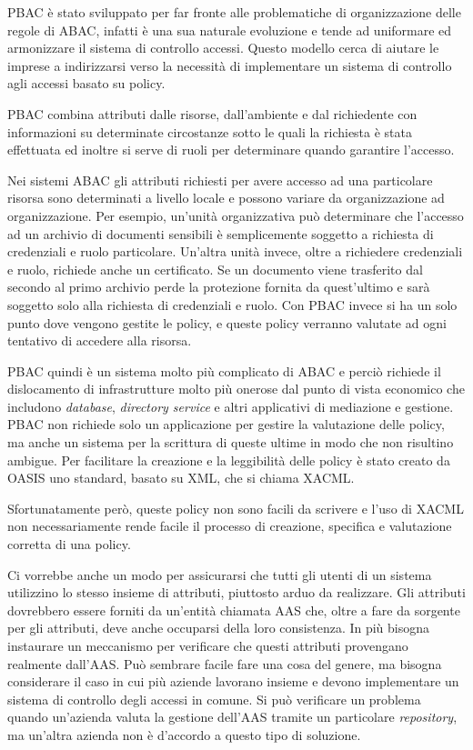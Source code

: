 \ac{PBAC} è stato sviluppato per far fronte alle problematiche di organizzazione delle regole di \ac{ABAC}, infatti è una sua naturale evoluzione e tende ad uniformare ed armonizzare il sistema di controllo accessi.
Questo modello cerca di aiutare le imprese a indirizzarsi verso la necessità di implementare un sistema di controllo agli accessi basato su policy.\par
\ac{PBAC} combina attributi dalle risorse, dall'ambiente e dal richiedente con informazioni su determinate circostanze sotto le quali la richiesta è stata effettuata ed inoltre si serve di 
ruoli per determinare quando garantire l'accesso.\par
Nei sistemi \ac{ABAC} gli attributi richiesti per avere accesso ad una particolare risorsa sono determinati a livello locale e possono variare da organizzazione ad organizzazione.
Per esempio, un'unità organizzativa può determinare che l'accesso ad un archivio di documenti sensibili è semplicemente soggetto a richiesta di credenziali e ruolo particolare.
Un'altra unità invece, oltre a richiedere credenziali e ruolo, richiede anche un certificato. Se un documento viene trasferito dal secondo al primo archivio perde la protezione fornita da quest'ultimo e sarà soggetto solo alla richiesta di credenziali e ruolo.
Con \ac{PBAC} invece si ha un solo punto dove vengono gestite le policy, e queste policy verranno valutate ad ogni tentativo di accedere alla risorsa.\par
\ac{PBAC} quindi è un sistema molto più complicato di \ac{ABAC} e perciò richiede il dislocamento di infrastrutture molto più onerose dal punto di vista economico che includono \textit{database}, \textit{directory service} e altri applicativi di mediazione e gestione.
\ac{PBAC} non richiede solo un applicazione per gestire la valutazione delle policy, ma
anche un sistema per la scrittura di queste ultime in modo che
non risultino ambigue.
Per facilitare la creazione e la leggibilità delle policy è stato creato da OASIS \cite{XACML} uno standard, basato su \ac{XML}, che si chiama \ac{XACML}.\par

Sfortunatamente però, queste policy non sono facili da scrivere e l’uso
di \ac{XACML} non necessariamente rende facile il processo di creazione, specifica e valutazione corretta di una policy. \par
Ci vorrebbe anche un modo per assicurarsi che tutti gli utenti di un sistema utilizzino lo stesso insieme di attributi, piuttosto arduo da realizzare. Gli attributi dovrebbero essere forniti da un’entità chiamata
\ac{AAS} che, oltre a fare da sorgente per gli
attributi, deve anche occuparsi della loro consistenza. In più bisogna instaurare
un meccanismo per verificare che questi attributi provengano
realmente dall’\ac{AAS}. Può sembrare facile fare una cosa del genere, ma
bisogna considerare il caso in cui più aziende lavorano insieme e devono
implementare un sistema di controllo degli accessi in comune. Si può verificare un problema
 quando un’azienda valuta la gestione dell’\ac{AAS}
tramite un particolare \textit{repository}, ma un’altra azienda non è d’accordo a
questo tipo di soluzione.

